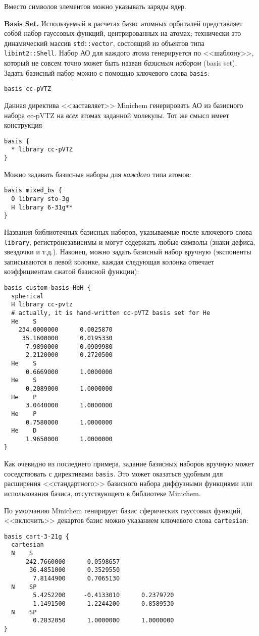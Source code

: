 \documentclass[a4paper]{book}
\begin{document}
Вместо символов элементов можно указывать заряды ядер.

\textbf{Basis Set.} Используемый в расчетах базис атомных орбиталей представляет собой набор гауссовых функций, центрированных на атомах;
технически это динамический массив \texttt{std::vector}, состоящий из объектов типа \texttt{libint2::Shell}.
Набор АО для каждого атома генерируется по <<шаблону>>, который не совсем точно может быть назван \textit{базисным набором} (basis set).
Задать базисный набор можно с помощью ключевого слова \texttt{basis}:
\begin{lstlisting}
basis cc-pVTZ
\end{lstlisting}
Данная директива <<заставляет>> Minichem генерировать АО из базисного набора cc-pVTZ на \textit{всех} атомах заданной молекулы.
Тот же смысл имеет конструкция
\begin{lstlisting}
basis {
  * library cc-pVTZ
}
\end{lstlisting}
Можно задавать базисные наборы для \textit{каждого} типа атомов:
\begin{lstlisting}
basis mixed_bs {
  O library sto-3g
  H library 6-31g**
}
\end{lstlisting}
Названия библиотечных базисных наборов, указываемые после ключевого слова \texttt{library}, регистронезависимы и могут содержать любые символы
(знаки дефиса, звездочки и т.д.).
Наконец, можно задать базисный набор вручную (экспоненты записываются в левой колонке, каждая следующая колонка отвечает коэффициентам
сжатой базисной функции):
\begin{lstlisting}
basis custom-basis-HeH {
  spherical
  H library cc-pvtz    
  # actually, it is hand-written cc-pVTZ basis set for He
  He    S
    234.0000000      0.0025870
     35.1600000      0.0195330
      7.9890000      0.0909980
      2.2120000      0.2720500
  He    S            
      0.6669000      1.0000000
  He    S            
      0.2089000      1.0000000
  He    P            
      3.0440000      1.0000000
  He    P            
      0.7580000      1.0000000
  He    D            
      1.9650000      1.0000000
}
\end{lstlisting}
Как очевидно из последнего примера, задание базисных наборов вручную может соседствовать с директивами \texttt{basis}. Это может оказаться
удобным для расширения <<стандартного>> базисного набора диффузными функциями или использования базиса, отсутствующего в библиотеке Minichem.

По умолчанию Minichem генирирует базис сферических гауссовых функций, <<включить>> декартов базис можно указанием ключевого слова \texttt{cartesian}:
\begin{lstlisting}
basis cart-3-21g {
  cartesian
  N    S
      242.7660000      0.0598657
       36.4851000      0.3529550
        7.8144900      0.7065130
  N    SP
        5.4252200     -0.4133010      0.2379720
        1.1491500      1.2244200      0.8589530
  N    SP
        0.2832050      1.0000000      1.0000000
}
\end{lstlisting}
\end{document}

